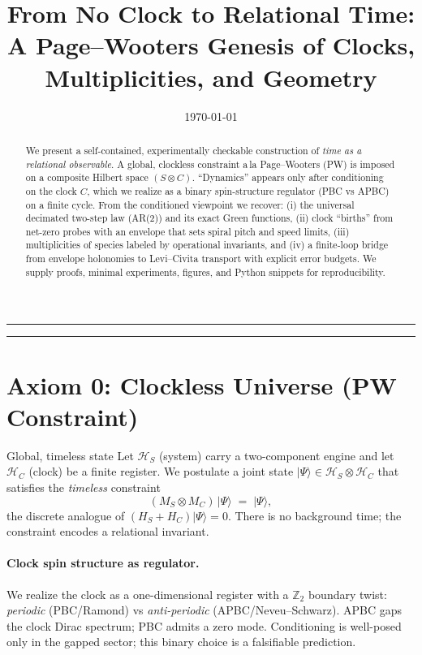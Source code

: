 \documentclass[11pt]{article}
\title{\vspace{-0.6cm}\Large From No Clock to Relational Time:\\
\large A Page--Wooters Genesis of Clocks, Multiplicities, and Geometry}
\author{}
\date{\today}
\newcommand{\M}{M}
\begin{document}
\maketitle
\vspace{-1.2em}\hrule\vspace{0.6em}

\begin{abstract}
We present a self-contained, experimentally checkable construction of \emph{time as a relational
observable}. A global, clockless constraint a\,la Page--Wooters (PW) is imposed on a composite
Hilbert space \((S\otimes C)\). ``Dynamics'' appears only after conditioning on the clock
$C$, which we realize as a binary spin-structure regulator (PBC vs APBC) on a finite cycle.
From the conditioned viewpoint we recover: (i) the universal decimated two-step law (AR(2))
and its exact Green functions, (ii) clock ``births'' from net-zero probes with an envelope that
sets spiral pitch and speed limits, (iii) multiplicities of species labeled by operational invariants,
and (iv) a finite-loop bridge from envelope holonomies to Levi--Civita transport with explicit
error budgets. We supply proofs, minimal experiments, figures, and Python snippets for
reproducibility.
\end{abstract}

\tableofcontents
\vspace{0.6em}\hrule\vspace{0.8em}

\section{Axiom 0: Clockless Universe (PW Constraint)}
\begin{mydef}{Global, timeless state}
Let $\mathcal H_S$ (system) carry a two-component engine and let $\mathcal H_C$ (clock)
be a finite register. We postulate a joint state $|\Psi\rangle\in \mathcal H_S\otimes\mathcal H_C$
that satisfies the \emph{timeless} constraint
\begin{equation}
(\M_S\otimes \M_C)\,|\Psi\rangle \;=\; |\Psi\rangle,
\label{eq:PWdiscrete}
\end{equation}
the discrete analogue of $(H_S+H_C)|\Psi\rangle=0$.
There is no background time; the constraint encodes a relational invariant.
\end{mydef}

\paragraph{Clock spin structure as regulator.}
We realize the clock as a one-dimensional register with a $\mathbb Z_2$ boundary twist:
\emph{periodic} (PBC/Ramond) vs \emph{anti-periodic} (APBC/Neveu--Schwarz).
APBC gaps the clock Dirac spectrum; PBC admits a zero mode. Conditioning
is well-posed only in the gapped sector; this binary choice is a falsifiable prediction.
\end{document}
